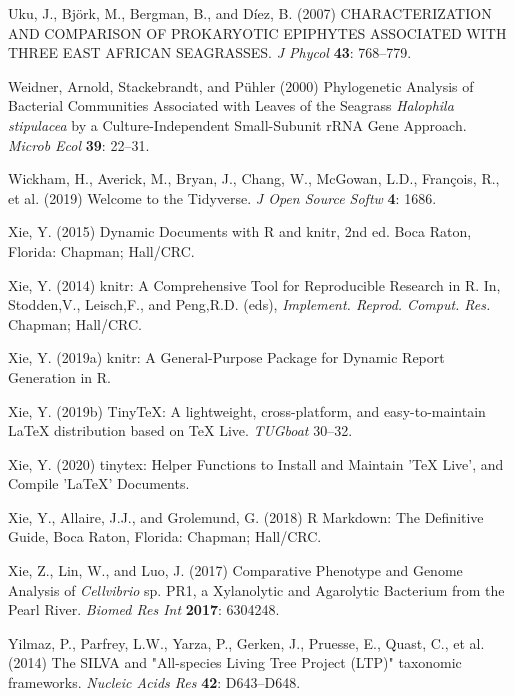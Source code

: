 \documentclass[12pt,]{article}
\begin{document}
\leavevmode\hypertarget{ref-Uku2007}{}%
Uku, J., Björk, M., Bergman, B., and Díez, B. (2007) CHARACTERIZATION
AND COMPARISON OF PROKARYOTIC EPIPHYTES ASSOCIATED WITH THREE EAST
AFRICAN SEAGRASSES. \emph{J Phycol} \textbf{43}: 768--779.

\leavevmode\hypertarget{ref-Weidner2000}{}%
Weidner, Arnold, Stackebrandt, and Pühler (2000) Phylogenetic Analysis
of Bacterial Communities Associated with Leaves of the Seagrass
\emph{Halophila stipulacea} by a Culture-Independent Small-Subunit rRNA
Gene Approach. \emph{Microb Ecol} \textbf{39}: 22--31.

\leavevmode\hypertarget{ref-Wickham2019}{}%
Wickham, H., Averick, M., Bryan, J., Chang, W., McGowan, L.D., François,
R., et al. (2019) Welcome to the Tidyverse. \emph{J Open Source Softw}
\textbf{4}: 1686.

\leavevmode\hypertarget{ref-Xie2015}{}%
Xie, Y. (2015) Dynamic Documents with R and knitr, 2nd ed. Boca Raton,
Florida: Chapman; Hall/CRC.

\leavevmode\hypertarget{ref-Xie2014}{}%
Xie, Y. (2014) knitr: A Comprehensive Tool for Reproducible Research in
R. In, Stodden,V., Leisch,F., and Peng,R.D. (eds), \emph{Implement.
Reprod. Comput. Res.} Chapman; Hall/CRC.

\leavevmode\hypertarget{ref-Xie2019a}{}%
Xie, Y. (2019a) knitr: A General-Purpose Package for Dynamic Report
Generation in R.

\leavevmode\hypertarget{ref-Xie2019}{}%
Xie, Y. (2019b) TinyTeX: A lightweight, cross-platform, and
easy-to-maintain LaTeX distribution based on TeX Live. \emph{TUGboat}
30--32.

\leavevmode\hypertarget{ref-Xie2020}{}%
Xie, Y. (2020) tinytex: Helper Functions to Install and Maintain 'TeX
Live', and Compile 'LaTeX' Documents.

\leavevmode\hypertarget{ref-Xie2018}{}%
Xie, Y., Allaire, J.J., and Grolemund, G. (2018) R Markdown: The
Definitive Guide, Boca Raton, Florida: Chapman; Hall/CRC.

\leavevmode\hypertarget{ref-Xie2017}{}%
Xie, Z., Lin, W., and Luo, J. (2017) Comparative Phenotype and Genome
Analysis of \emph{Cellvibrio} sp. PR1, a Xylanolytic and Agarolytic
Bacterium from the Pearl River. \emph{Biomed Res Int} \textbf{2017}:
6304248.

\leavevmode\hypertarget{ref-Yilmaz2014}{}%
Yilmaz, P., Parfrey, L.W., Yarza, P., Gerken, J., Pruesse, E., Quast,
C., et al. (2014) The SILVA and "All-species Living Tree Project (LTP)"
taxonomic frameworks. \emph{Nucleic Acids Res} \textbf{42}: D643--D648.
\end{document}
